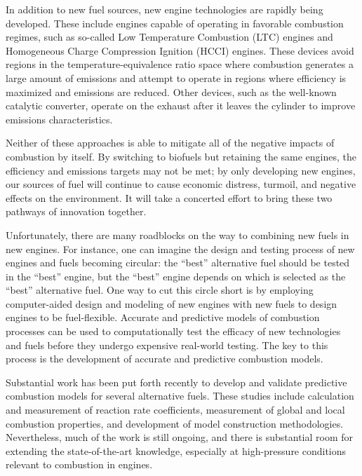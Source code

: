 \documentclass[12pt, letterpaper]{article}
\begin{document}
In addition to new fuel sources, new engine technologies are rapidly being 
developed. These include engines capable of operating in favorable combustion 
regimes, such as so-called Low Temperature Combustion (LTC) engines and 
Homogeneous Charge Compression Ignition (HCCI) engines. These devices avoid 
regions in the temperature-equivalence ratio space where combustion generates a 
large amount of emissions and attempt to operate in regions where efficiency is 
maximized and emissions are reduced. Other devices, such as the well-known 
catalytic converter, operate on the exhaust after it leaves the cylinder to 
improve emissions characteristics.

Neither of these approaches is able to mitigate all of the negative impacts of 
combustion by itself. By switching to biofuels but retaining the same engines, 
the efficiency and emissions targets may not be met; by only developing new 
engines, our sources of fuel will continue to cause economic distress, turmoil, 
and negative effects on the environment. It will take a concerted effort to 
bring these two pathways of innovation together.

Unfortunately, there are many roadblocks on the way to combining new fuels in 
new engines. For instance, one can imagine the design and testing process of 
new engines and fuels becoming circular: the “best” alternative fuel should be 
tested in the “best” engine, but the “best” engine depends on which is selected 
as the “best” alternative fuel. One way to cut this circle short is by 
employing computer-aided design and modeling of new engines with new fuels to 
design engines to be fuel-flexible. Accurate and predictive models of 
combustion processes can be used to computationally test the efficacy of new 
technologies and fuels before they undergo expensive real-world testing. The 
key to this process is the development of accurate and predictive combustion 
models.

Substantial work has been put forth recently to develop and validate predictive 
combustion models for several alternative fuels. These studies include 
calculation and measurement of reaction rate coefficients, measurement of 
global and local combustion properties, and development of model construction 
methodologies. Nevertheless, much of the work is still ongoing, and there is 
substantial room for extending the state-of-the-art knowledge, especially at 
high-pressure conditions relevant to combustion in engines.
\end{document}
